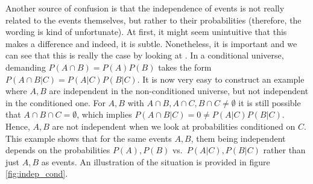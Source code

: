 Another source of confusion is that the independence of events is not really related to the events themselves, but rather to their probabilities (therefore, the wording is kind of unfortunate). At first, it might seem unintuitive that this makes a difference and indeed, it is subtle. Nonetheless, it is important and we can see that this is really the case by looking at . In a conditional universe, demanding $P(A \cap B) = P(A) P(B)$ takes the form $P(A \cap B | C) = P(A | C) P(B | C)$. It is now very easy to construct an example where $A, B$ are independent in the non-conditioned universe, but not independent in the conditioned one. For $A, B$ with $A \cap B, A \cap C, B \cap C \neq \emptyset$ it is still possible that $A \cap B \cap C = \emptyset$, which implies $P(A \cap B | C) = 0 \neq P(A | C) P(B | C)$. Hence, $A, B$ are not independent when we look at probabilities conditioned on $C$. This example shows that for the same events $A, B$, them being independent depends on the probabilities $P(A), P(B)$ vs.~$P(A | C), P(B | C)$ rather than just $A, B$ as events. An illustration of the situation is provided in figure \ref{fig:indep_cond}.



